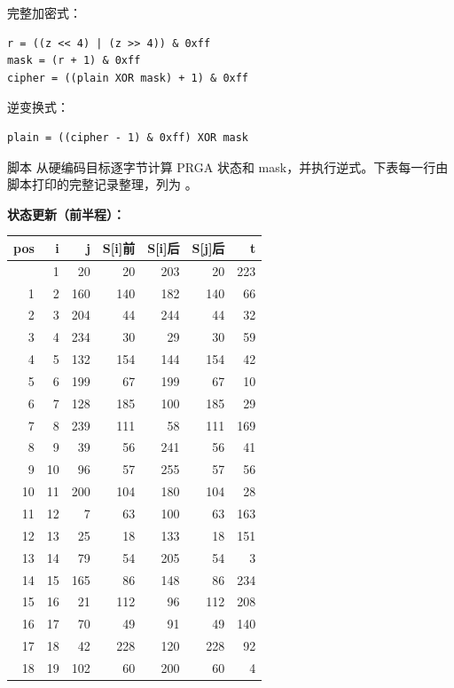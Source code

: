 完整加密式：

\begin{verbatim}
r = ((z << 4) | (z >> 4)) & 0xff
mask = (r + 1) & 0xff
cipher = ((plain XOR mask) + 1) & 0xff
\end{verbatim}

逆变换式：

\begin{verbatim}
plain = ((cipher - 1) & 0xff) XOR mask
\end{verbatim}

脚本 \texttt{} 从硬编码目标逐字节计算 PRGA 状态和 mask，并执行逆式。下表每一行由脚本打印的完整记录整理，列为 \texttt{}。

\textbf{状态更新（前半程）：}

{\def\LTcaptype{} %
\begin{longtable}[]{@{}rrrrrrr@{}}
\toprule\noalign{}
pos & i & j & S{[}i{]}前 & S{[}i{]}后 & S{[}j{]}后 & t \\
\midrule\noalign{}
\endhead
\bottomrule\noalign{}
\endlastfoot
0 & 1 & 20 & 20 & 203 & 20 & 223 \\
1 & 2 & 160 & 140 & 182 & 140 & 66 \\
2 & 3 & 204 & 44 & 244 & 44 & 32 \\
3 & 4 & 234 & 30 & 29 & 30 & 59 \\
4 & 5 & 132 & 154 & 144 & 154 & 42 \\
5 & 6 & 199 & 67 & 199 & 67 & 10 \\
6 & 7 & 128 & 185 & 100 & 185 & 29 \\
7 & 8 & 239 & 111 & 58 & 111 & 169 \\
8 & 9 & 39 & 56 & 241 & 56 & 41 \\
9 & 10 & 96 & 57 & 255 & 57 & 56 \\
10 & 11 & 200 & 104 & 180 & 104 & 28 \\
11 & 12 & 7 & 63 & 100 & 63 & 163 \\
12 & 13 & 25 & 18 & 133 & 18 & 151 \\
13 & 14 & 79 & 54 & 205 & 54 & 3 \\
14 & 15 & 165 & 86 & 148 & 86 & 234 \\
15 & 16 & 21 & 112 & 96 & 112 & 208 \\
16 & 17 & 70 & 49 & 91 & 49 & 140 \\
17 & 18 & 42 & 228 & 120 & 228 & 92 \\
18 & 19 & 102 & 60 & 200 & 60 & 4 \\
\end{longtable}
}

